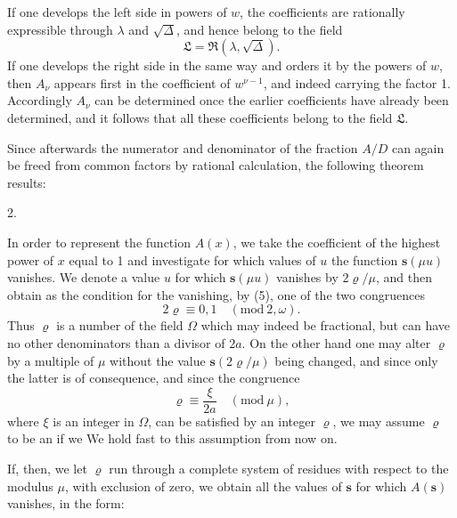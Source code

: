 If one develops the left side in powers of $w$, the coefficients are
rationally expressible through $\lambda$ and $\sqrt{\Delta}$, and hence
belong to the field
\[
\mathfrak{L} = \mathfrak{R}(\lambda, \sqrt{\Delta}).
\]
If one develops the right side in the same way and orders it by the
powers of $w$, then $A_\nu$ appears first in the coefficient of
$w^{\nu-1}$, and indeed carrying the factor 1. Accordingly $A_\nu$ can
be determined once the earlier coefficients have already been
determined, and it follows that all these coefficients belong to the
field $\mathfrak{L}$.

Since afterwards the numerator and denominator of the fraction $A/D$
can again be freed from common factors by rational calculation, the
following theorem results:

2. 

In order to represent the function $A(x)$, we take the coefficient of
the highest power of $x$ equal to 1 and investigate for which values of
$u$ the function $\boldsymbol{s}(\mu u)$ vanishes. We denote a value
$u$ for which $\boldsymbol{s}(\mu u)$ vanishes by $2\varrho/\mu$, and
then obtain as the condition for the vanishing, by (5), one of the two
congruences
\[
2\varrho \equiv 0, 1 \quad (\mathrm{mod}\ 2, \omega).
\]
Thus $\varrho$ is a number of the field $\Omega$ which may indeed be
fractional, but can have no other denominators than a divisor of $2a$.
On the other hand one may alter $\varrho$ by a multiple of $\mu$
without the value $\boldsymbol{s}(2\varrho/\mu)$ being changed, and
since only the latter is of consequence, and since the congruence
\[
\varrho \equiv \frac{\xi}{2a} \quad (\mathrm{mod}\ \mu),
\]
where $\xi$ is an integer in $\Omega$, can be satisfied by an integer
$\varrho$, we may assume $\varrho$ to be an  if we  We hold fast to this assumption from now on.

If, then, we let $\varrho$ run through a complete system of residues
with respect to the modulus $\mu$, with exclusion of zero, we obtain
all the values of $\boldsymbol{s}$ for which $A(\boldsymbol{s})$
vanishes, in the form:
